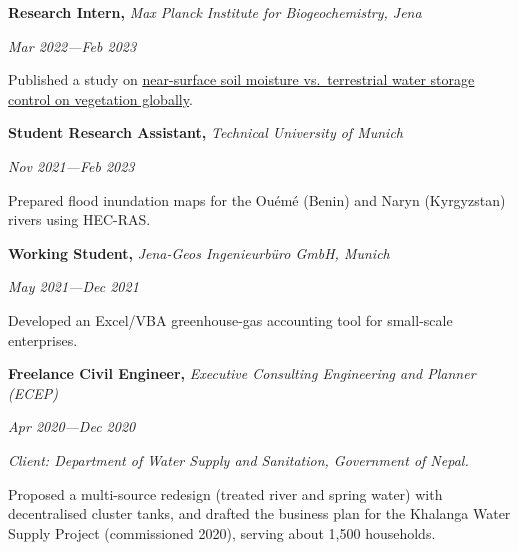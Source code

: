 \documentclass[10pt,letterpaper]{article}
\newcommand{\ulink}[2]{\href{#1}{\uline{#2}}}
\newlength{\cvlabelwidth}
\newenvironment{cvsection}[1]{%
  \begin{list}{}{%
    \setlength{\leftmargin}{\cvlabelwidth}%
    \addtolength{\leftmargin}{0.12in}%
    \setlength{\labelwidth}{\cvlabelwidth}%
    \setlength{\labelsep}{0.12in}%
    \setlength{\itemindent}{0pt}%
    \setlength{\listparindent}{0pt}%
    \setlength{\topsep}{0.02in}%
    \setlength{\parsep}{0pt}%
    \setlength{\itemsep}{0pt}%
    \renewcommand{\makelabel}[1]{%
      \parbox[t]{\cvlabelwidth}{\raggedright\textcolor{cvblue}{\textsc{##1}}}}%
  }%
  \item[#1]%
}{\end{list}}
\newcommand{\entry}[3]{%
  \noindent
  \begin{minipage}[t]{0.72\linewidth}\raggedright\textbf{#1}\textit{#2}\end{minipage}%
  \hfill
  \begin{minipage}[t]{0.26\linewidth}\raggedleft\textit{#3}\end{minipage}%
  \par
}
\newcommand{\detail}[1]{%
  \hspace*{0.55em}\textendash\hspace{0.4em}%
  \parbox[t]{\dimexpr\linewidth-1.75em}{\raggedright #1}\par}
\newcommand{\gap}{\vspace{0.02in}}
\begin{document}
\begin{cvsection}{Employment}
  \entry{Research Intern, }{Max Planck Institute for Biogeochemistry, Jena}{Mar 2022---Feb 2023}
  \detail{Published a study on \ulink{https://doi.org/10.5194/bg-21-1533-2024}{near-surface soil moisture
          vs.\ terrestrial water storage control on vegetation globally}.}
  \gap
  \entry{Student Research Assistant, }{Technical University of Munich}{Nov 2021---Feb 2023}
  \detail{Prepared flood inundation maps for the Ouémé (Benin) and Naryn (Kyrgyzstan)
          rivers using HEC-RAS.}
  \gap
  \entry{Working Student, }{Jena-Geos Ingenieurbüro GmbH, Munich}{May 2021---Dec 2021}
  \detail{Developed an Excel/VBA greenhouse-gas accounting tool for small-scale
          enterprises.}
  \gap
  \entry{Freelance Civil Engineer, }{Executive Consulting Engineering and Planner (ECEP)}{Apr 2020---Dec 2020}
  \hspace*{0.55em}\textit{Client: Department of Water Supply and Sanitation, Government of Nepal.}\par
  \detail{Proposed a multi-source redesign (treated river and spring water) with decentralised
          cluster tanks, and drafted the business plan for the Khalanga Water Supply Project
          (commissioned 2020), serving about 1,500 households.}
\end{cvsection}
\end{document}
